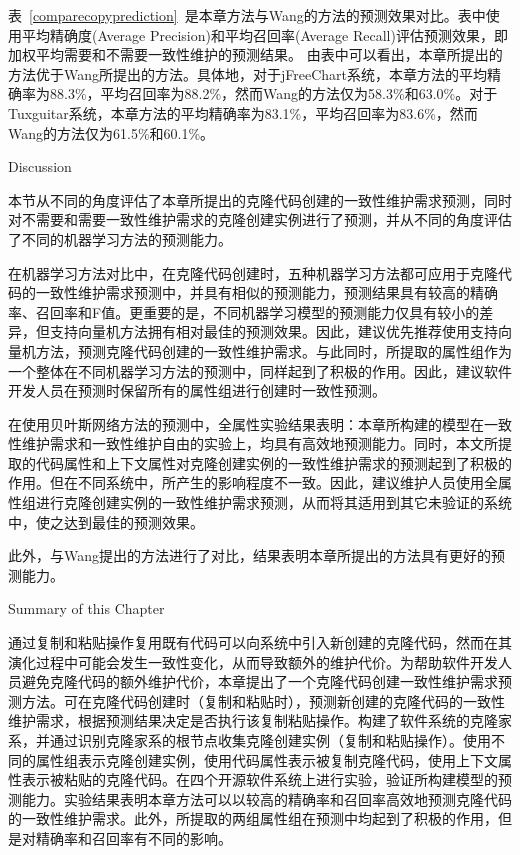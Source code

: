 表~\ref{comparecopyprediction}~是本章方法与Wang的方法的预测效果对比。表中使用平均精确度(Average Precision)和平均召回率(Average Recall)评估预测效果，即加权平均需要和不需要一致性维护的预测结果。
由表中可以看出，本章所提出的方法优于Wang所提出的方法。具体地，对于jFreeChart系统，本章方法的平均精确率为88.3\%，平均召回率为88.2\%，然而Wang的方法仅为58.3\%和63.0\%。对于Tuxguitar系统，本章方法的平均精确率为83.1\%，平均召回率为83.6\%，然而Wang的方法仅为61.5\%和60.1\%。

{Discussion}

本节从不同的角度评估了本章所提出的克隆代码创建的一致性维护需求预测，同时对不需要和需要一致性维护需求的克隆创建实例进行了预测，并从不同的角度评估了不同的机器学习方法的预测能力。

在机器学习方法对比中，在克隆代码创建时，五种机器学习方法都可应用于克隆代码的一致性维护需求预测中，并具有相似的预测能力，预测结果具有较高的精确率、召回率和F值。更重要的是，不同机器学习模型的预测能力仅具有较小的差异，但支持向量机方法拥有相对最佳的预测效果。因此，建议优先推荐使用支持向量机方法，预测克隆代码创建的一致性维护需求。与此同时，所提取的属性组作为一个整体在不同机器学习方法的预测中，同样起到了积极的作用。因此，建议软件开发人员在预测时保留所有的属性组进行创建时一致性预测。

在使用贝叶斯网络方法的预测中，全属性实验结果表明：本章所构建的模型在一致性维护需求和一致性维护自由的实验上，均具有高效地预测能力。同时，本文所提取的代码属性和上下文属性对克隆创建实例的一致性维护需求的预测起到了积极的作用。但在不同系统中，所产生的影响程度不一致。因此，建议维护人员使用全属性组进行克隆创建实例的一致性维护需求预测，从而将其适用到其它未验证的系统中，使之达到最佳的预测效果。

此外，与Wang提出的方法进行了对比，结果表明本章所提出的方法具有更好的预测能力。

{Summary of this Chapter}

通过复制和粘贴操作复用既有代码可以向系统中引入新创建的克隆代码，然而在其演化过程中可能会发生一致性变化，从而导致额外的维护代价。为帮助软件开发人员避免克隆代码的额外维护代价，本章提出了一个克隆代码创建一致性维护需求预测方法。可在克隆代码创建时（复制和粘贴时），预测新创建的克隆代码的一致性维护需求，根据预测结果决定是否执行该复制粘贴操作。构建了软件系统的克隆家系，并通过识别克隆家系的根节点收集克隆创建实例（复制和粘贴操作）。使用不同的属性组表示克隆创建实例，使用代码属性表示被复制克隆代码，使用上下文属性表示被粘贴的克隆代码。在四个开源软件系统上进行实验，验证所构建模型的预测能力。实验结果表明本章方法可以以较高的精确率和召回率高效地预测克隆代码的一致性维护需求。此外，所提取的两组属性组在预测中均起到了积极的作用，但是对精确率和召回率有不同的影响。

